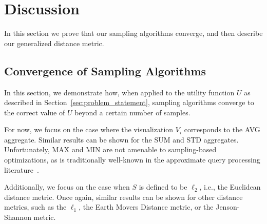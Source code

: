 
\section{Discussion}
In this section we prove that our sampling 
algorithms converge, and then describe our generalized
distance metric.
\subsection{Convergence of Sampling Algorithms}
In this section, we demonstrate how,
when applied to the utility function $U$ as described
in Section~\ref{sec:problem_statement},
sampling algorithms 
converge to the correct value of $U$ beyond a certain number of samples.

For now, we focus on the case where the visualization $V_i$
corresponds to the AVG aggregate. 
Similar results can be shown for the SUM and STD
aggregates. 
Unfortunately, MAX and MIN are not amenable to sampling-based
optimizations, as is traditionally well-known in the approximate
query processing literature~\cite{wavelets,dbo}.

Additionally, we focus on the case when $S$ is defined to be
$\ell_2$, i.e., the Euclidean distance metric. 
Once again, similar results can be shown for other distance metrics,
such as the $\ell_1$, the Earth Movers Distance metric, or
the Jenson-Shannon metric.

